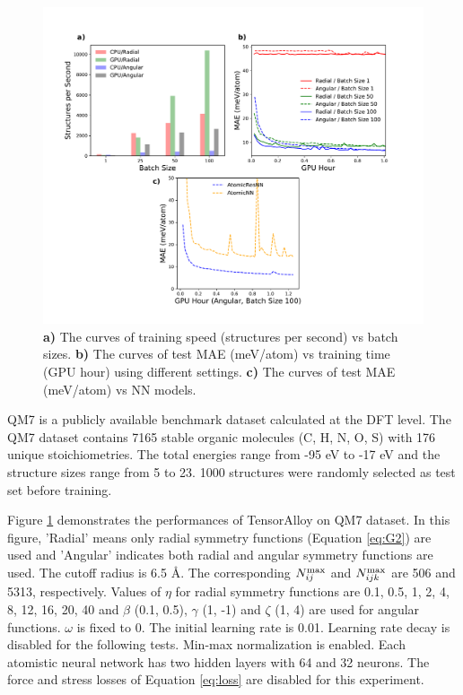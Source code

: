\documentclass[preprint]{revtex4-2}
\begin{document}
% 
%
\begin{figure}[h!]
\centering
\includegraphics[scale=0.54]{figures/qm7_speed.pdf}
\caption{\label{fig:benchmark_qm7} 
\textbf{a)} The curves of training speed (structures per second) vs batch sizes. 
\textbf{b)} The curves of test MAE (meV/atom) vs training time (GPU hour) using 
different settings.
\textbf{c)} The curves of test MAE (meV/atom) vs NN models. 
}
\end{figure}

QM7\cite{QM7_1,QM7_2} is a publicly available benchmark dataset calculated at 
the DFT level. The QM7 dataset contains 7165 stable organic molecules 
(C, H, N, O, S) with 176 unique stoichiometries. The total energies range from 
-95 eV to -17 eV and the structure sizes range from 5 to 23. 1000 structures 
were randomly selected as test set before training.

Figure \ref{fig:benchmark_qm7} demonstrates the performances of 
TensorAlloy on QM7 dataset. In this figure, 'Radial' means only radial 
symmetry functions (Equation \ref{eq:G2}) are used and 'Angular' indicates both 
radial and angular symmetry functions are used. The cutoff radius is 6.5 \AA.
The corresponding $N_{ij}^{\mathrm{max}}$ and $N_{ijk}^{\mathrm{max}}$ are 506 and 5313, respectively.
Values of $\eta$ for radial symmetry functions are 0.1, 0.5, 1, 2, 4, 8, 12, 16, 
20, 40 and $\beta$ (0.1, 0.5), $\gamma$ (1, -1) and $\zeta$ (1, 4) are used for
angular functions. $\omega$ is fixed to 0. The initial learning rate is 0.01. 
Learning rate decay is disabled for the following tests. Min-max normalization
is enabled. Each atomistic neural network has two hidden layers with 64 and 32 
neurons. The force and stress losses of Equation \ref{eq:loss} are disabled for 
this experiment.
\end{document}
